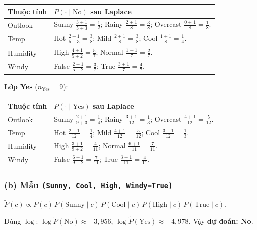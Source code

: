 \begin{center}
{\small
\begin{tabular}{@{}ll@{}}\toprule
Thuộc tính & \(P(\cdot\mid \text{No})\) sau Laplace \\\midrule
Outlook &
  Sunny \(\frac{3+1}{5+3}=\frac12\); Rainy \(\frac{2+1}{8}=\frac38\); Overcast \(\frac{0+1}{8}=\frac18\). \\
Temp &
  Hot \(\frac{2+1}{5+3}=\frac38\); Mild \(\frac{2+1}{8}=\frac38\); Cool \(\frac{1+1}{8}=\frac14\). \\
Humidity &
  High \(\frac{4+1}{5+2}=\frac57\); Normal \(\frac{1+1}{7}=\frac27\). \\
Windy &
  False \(\frac{2+1}{5+2}=\frac37\); True \(\frac{3+1}{7}=\frac47\). \\
\bottomrule
\end{tabular}
}
\end{center}

\noindent\textbf{Lớp Yes} (\(n_{\text{Yes}}=9\)):

\begin{center}
{\small
\begin{tabular}{@{}ll@{}}\toprule
Thuộc tính & \(P(\cdot\mid \text{Yes})\) sau Laplace \\\midrule
Outlook &
  Sunny \(\frac{2+1}{9+3}=\frac14\); Rainy \(\frac{3+1}{12}=\frac13\); Overcast \(\frac{4+1}{12}=\frac{5}{12}\). \\
Temp &
  Hot \(\frac{2+1}{12}=\frac14\); Mild \(\frac{4+1}{12}=\frac{5}{12}\); Cool \(\frac{3+1}{12}=\frac13\). \\
Humidity &
  High \(\frac{3+1}{9+2}=\frac{4}{11}\); Normal \(\frac{6+1}{11}=\frac{7}{11}\). \\
Windy &
  False \(\frac{6+1}{9+2}=\frac{7}{11}\); True \(\frac{3+1}{11}=\frac{4}{11}\). \\
\bottomrule
\end{tabular}
}
\end{center}

\subsubsection*{(b) Mẫu \texttt{(Sunny, Cool, High, Windy=True)}}

\(\tilde P(c)\propto P(c)\,P(\text{Sunny}\mid c)\,P(\text{Cool}\mid c)\,P(\text{High}\mid c)\,P(\text{True}\mid c)\).

Dùng \(\log\): \(\log\tilde P(\text{No})\approx -3{,}956\), \(\log\tilde P(\text{Yes})\approx -4{,}978\). Vậy \textbf{dự đoán: No}.

